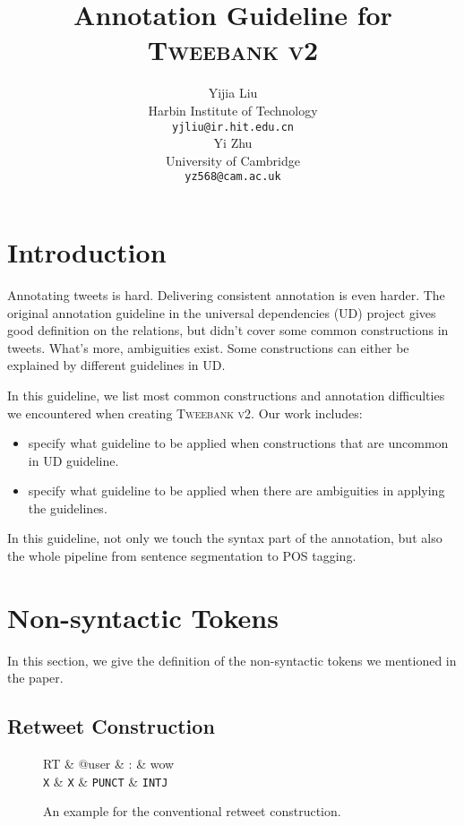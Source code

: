 \documentclass[11pt,a4paper]{article}
\title{Annotation Guideline for \textsc{Tweebank v2}}
\author{Yijia Liu \\
	Harbin Institute of Technology \\
	{\tt yjliu@ir.hit.edu.cn} \\\And
	Yi Zhu \\
	University of Cambridge \\
	{\tt yz568@cam.ac.uk} \\\AND
}
\date{}
\begin{document}
\maketitle

\section{Introduction}
Annotating tweets is hard. 
Delivering consistent annotation is even harder.
The original annotation guideline in the universal dependencies (UD) project
gives good definition on the relations, but didn't cover some common
constructions in tweets.
What's more, ambiguities exist. 
Some constructions can either be explained by different guidelines in UD.

In this guideline, we list most common constructions
and annotation difficulties we encountered when creating \textsc{Tweebank v2}.
Our work includes:
\begin{itemize}
	\item specify what guideline to be applied when constructions that are
	uncommon in UD guideline.
	\item specify what guideline to be applied when there are ambiguities in
	applying the guidelines.
\end{itemize}

In this guideline, not only we touch the syntax part of the annotation,
but also the whole pipeline from sentence segmentation to POS tagging. 
\section{Non-syntactic Tokens}

In this section, we give the definition of the non-syntactic tokens
we mentioned in the paper.

\subsection{Retweet Construction}

\begin{figure}[t]
	\centering
	\small
	\begin{dependency}[edge slant=2, text only label, label style=above]
		\begin{deptext}
			RT \& @user \& : \& wow \\
			\texttt{X} \& \texttt{X} \& \texttt{PUNCT} \& \texttt{INTJ} \\
		\end{deptext}
	\end{dependency}
	\caption{An example for the conventional retweet construction.}\label{fig:rt}
\end{figure}
\end{document}
